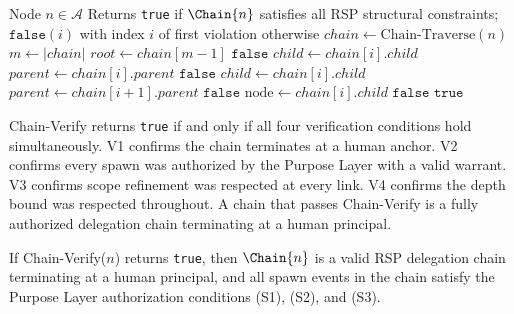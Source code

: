 \begin{algorithm}[htbp]
\caption{Chain-Verify($n$)}
\label{alg:chain_verify}
\begin{algorithmic}[1]
\Require Node $n \in \mathcal{A}$
\Ensure Returns \texttt{true} if $\Chain{n}$ satisfies all RSP structural constraints; $\texttt{false}(i)$ with index $i$ of first violation otherwise
\State $chain \gets \text{Chain-Traverse}(n)$
\State $m \gets |chain|$
\Statex
{}
\State $root \gets chain[m-1]$
    \State \Return $\texttt{false}$ 
\EndIf
\Statex
{}
    \State $child \leftarrow chain[i].child$
    \State $parent \leftarrow chain[i].parent$
        \State \Return $\texttt{false}$ 
    \EndIf
\EndFor
\Statex
{}
    \State $child \leftarrow chain[i].child$
    \State $parent \leftarrow chain[i+1].parent$
        \State \Return $\texttt{false}$ 
    \EndIf
\EndFor
\Statex
{}
    \State $\text{node} \gets chain[i].child$
        \State \Return $\texttt{false}$ 
    \EndIf
\EndFor
\State \Return $\texttt{true}$
\end{algorithmic}
\end{algorithm}

Chain-Verify returns \texttt{true} if and only if all four verification conditions hold simultaneously. V1 confirms the chain terminates at a human anchor. V2 confirms every spawn was authorized by the Purpose Layer with a valid warrant. V3 confirms scope refinement was respected at every link. V4 confirms the depth bound was respected throughout. A chain that passes Chain-Verify is a fully authorized delegation chain terminating at a human principal.

\begin{prop}
\label{prop:chain_verify_soundness}
If Chain-Verify($n$) returns \texttt{true}, then $\Chain{n}$ is a valid RSP delegation chain terminating at a human principal, and all spawn events in the chain satisfy the Purpose Layer authorization conditions (S1), (S2), and (S3).
\end{prop}

